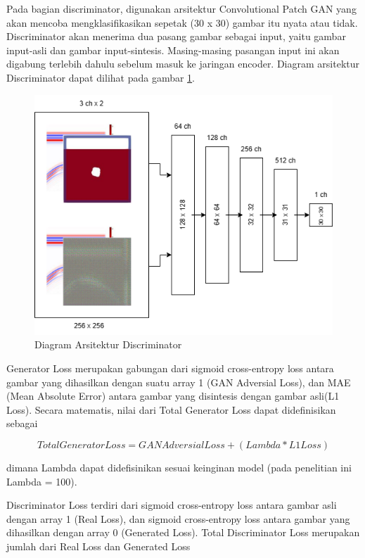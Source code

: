 Pada bagian discriminator, digunakan arsitektur Convolutional Patch GAN yang akan mencoba mengklasifikasikan sepetak (30 x 30) gambar itu nyata atau tidak. 
Discriminator akan menerima dua pasang gambar sebagai input, yaitu gambar input-asli dan gambar input-sintesis. 
Masing-masing pasangan input ini akan digabung terlebih dahulu sebelum masuk ke jaringan encoder. 
Diagram arsitektur Discriminator dapat dilihat pada gambar \ref{fig:discriminator}.

\begin{figure}[ht]
  \centering
  \includegraphics[scale=0.5]{gambar/Discriminator.png}
  \caption{Diagram Arsitektur Discriminator}
  \label{fig:discriminator}
\end{figure}

Generator Loss merupakan gabungan dari sigmoid cross-entropy loss antara gambar yang dihasilkan dengan suatu array 1 (GAN Adversial Loss), dan MAE (Mean Absolute Error) antara gambar yang disintesis dengan gambar asli(L1 Loss). 
Secara matematis, nilai dari Total Generator Loss dapat didefinisikan sebagai 

\begin{equation}
  \label{eq:genLoss}
  Total Generator Loss = GAN Adversial Loss + (Lambda * L1 Loss) 
\end{equation}

dimana Lambda dapat didefisinikan sesuai keinginan model (pada penelitian ini Lambda = 100).

Discriminator Loss terdiri dari sigmoid cross-entropy loss antara gambar asli dengan array 1 (Real Loss), dan sigmoid cross-entropy loss antara gambar yang dihasilkan dengan array 0 (Generated Loss). 
Total Discriminator Loss merupakan jumlah dari Real Loss dan Generated Loss


